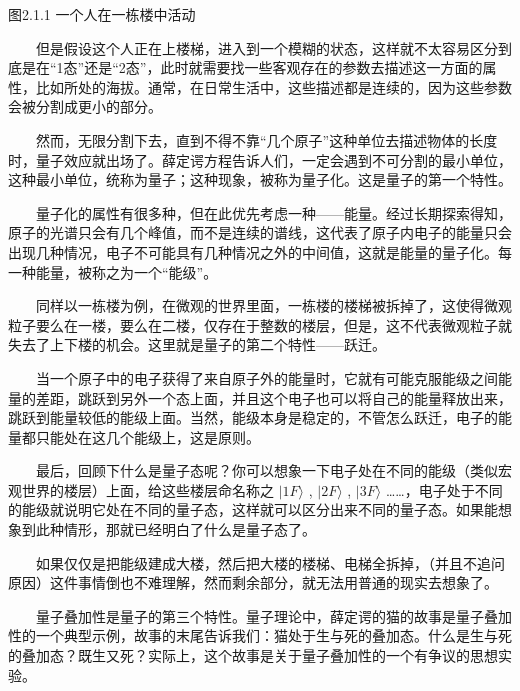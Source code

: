 \documentclass[a4paper,11pt,english]{sphinxmanual}
\begin{document}
\begin{center}图2.1.1 一个人在一栋楼中活动
\end{center}
\sphinxAtStartPar
  但是假设这个人正在上楼梯，进入到一个模糊的状态，这样就不太容易区分到底是在“1态”还是“2态”，此时就需要找一些客观存在的参数去描述这一方面的属性，比如所处的海拔。通常，在日常生活中，这些描述都是连续的，因为这些参数会被分割成更小的部分。

\sphinxAtStartPar
  然而，无限分割下去，直到不得不靠“几个原子”这种单位去描述物体的长度时，量子效应就出场了。薛定谔方程告诉人们，一定会遇到不可分割的最小单位，这种最小单位，统称为量子；这种现象，被称为量子化。这是量子的第一个特性。

\sphinxAtStartPar
  量子化的属性有很多种，但在此优先考虑一种——能量。经过长期探索得知，原子的光谱只会有几个峰值，而不是连续的谱线，这代表了原子内电子的能量只会出现几种情况，电子不可能具有几种情况之外的中间值，这就是能量的量子化。每一种能量，被称之为一个“能级”。

\sphinxAtStartPar
  同样以一栋楼为例，在微观的世界里面，一栋楼的楼梯被拆掉了，这使得微观粒子要么在一楼，要么在二楼，仅存在于整数的楼层，但是，这不代表微观粒子就失去了上下楼的机会。这里就是量子的第二个特性——跃迁。

\sphinxAtStartPar
  当一个原子中的电子获得了来自原子外的能量时，它就有可能克服能级之间能量的差距，跳跃到另外一个态上面，并且这个电子也可以将自己的能量释放出来，跳跃到能量较低的能级上面。当然，能级本身是稳定的，不管怎么跃迁，电子的能量都只能处在这几个能级上，这是原则。

\sphinxAtStartPar
  最后，回顾下什么是量子态呢？你可以想象一下电子处在不同的能级（类似宏观世界的楼层）上面，给这些楼层命名称之  \(|1F\rangle\) ,  \(|2F\rangle\) ,  \(|3F\rangle\) ……，电子处于不同的能级就说明它处在不同的量子态，这样就可以区分出来不同的量子态。如果能想象到此种情形，那就已经明白了什么是量子态了。

\sphinxAtStartPar
{}

\sphinxAtStartPar
  如果仅仅是把能级建成大楼，然后把大楼的楼梯、电梯全拆掉，（并且不追问原因）这件事情倒也不难理解，然而剩余部分，就无法用普通的现实去想象了。

\sphinxAtStartPar
  量子叠加性是量子的第三个特性。量子理论中，薛定谔的猫的故事是量子叠加性的一个典型示例，故事的末尾告诉我们：猫处于生与死的叠加态。什么是生与死的叠加态？既生又死？实际上，这个故事是关于量子叠加性的一个有争议的思想实验。

\end{document}
